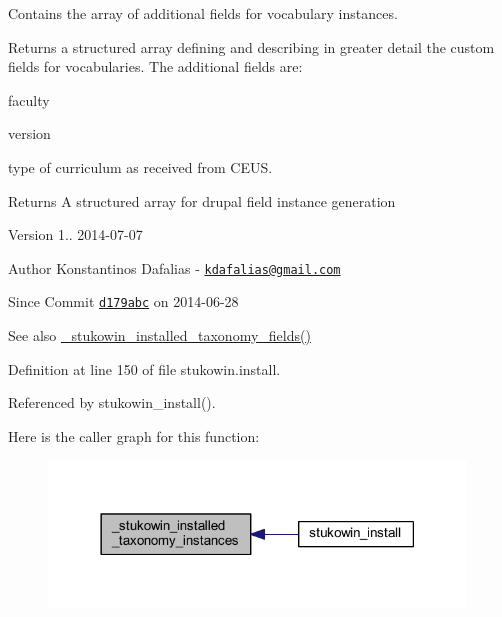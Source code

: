 Contains the array of additional fields for vocabulary instances. 

Returns a structured array defining and describing in greater detail the custom fields for vocabularies. The additional fields are\+:
\begin{DoxyItemize}
\item faculty
\item version
\item type of curriculum as received from C\+E\+U\+S.
\end{DoxyItemize}

\begin{DoxyReturn}{Returns}
A structured array for drupal field instance generation
\end{DoxyReturn}
\begin{DoxyVersion}{Version}
1.. 2014-\/07-\/07 
\end{DoxyVersion}
\begin{DoxyAuthor}{Author}
Konstantinos Dafalias -\/ \href{mailto:kdafalias@gmail.com}{\tt kdafalias@gmail.\+com} 
\end{DoxyAuthor}
\begin{DoxySince}{Since}
Commit \href{http://github.com/TheJake123/DrupalModul/commit/d179abcc5e05743086cd67cf1ce30b08923a7183}{\tt d179abc} on 2014-\/06-\/28
\end{DoxySince}
\begin{DoxySeeAlso}{See also}
\hyperlink{group___stukowin___module_ga0dbd0252e3db9efdb3cfefbefecf3d2e}{\+\_\+stukowin\+\_\+installed\+\_\+taxonomy\+\_\+fields()} 
\end{DoxySeeAlso}


Definition at line 150 of file stukowin.\+install.



Referenced by stukowin\+\_\+install().



Here is the caller graph for this function\+:
\nopagebreak
\begin{figure}[H]
\begin{center}
\leavevmode
\includegraphics[width=314pt]{group___stukowin___module_gafd634a2fb5766e1053fa7df79ab11c79_icgraph}
\end{center}
\end{figure}


